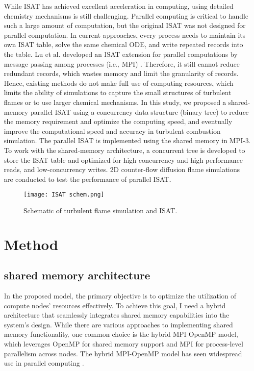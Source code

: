 While ISAT has achieved excellent acceleration in computing, using detailed chemistry mechanisms is still challenging. Parallel computing is critical to handle such a large amount of computation, but the original ISAT was not designed for parallel computation. In current approaches, every process needs to maintain its own ISAT table, solve the same chemical ODE, and write repeated records into the table. Lu et al. developed an ISAT extension for parallel computations by message passing among processes (i.e., MPI) \cite{lu2005investigation}. Therefore, it still cannot reduce redundant records, which wastes memory and limit the granularity of records.
Hence, existing methods do not make full use of computing resources, which limits the ability of simulations to capture the small structures of turbulent flames or to use larger chemical mechanisms. 
In this study, we proposed a shared-memory parallel ISAT using a concurrency data structure (binary tree) to reduce the memory requirement and optimize the computing speed, and eventually improve the computational speed and accuracy in turbulent combustion simulation. The parallel ISAT is implemented using the shared memory in MPI-3. To work with the shared-memory architecture, a concurrent tree is developed to store the ISAT table and optimized for high-concurrency and high-performance reads, and low-concurrency writes. 2D counter-flow diffusion flame simulations are conducted to test the performance of parallel ISAT.



\begin{figure}[htbp]
    \centering
\texttt{[image: ISAT schem.png]} 
\caption{Schematic of turbulent flame simulation and ISAT.}
\label{ISAT_Schematic} 
\end{figure}




\section{Method}
\subsection{shared memory architecture}
In the proposed model, the primary objective is to optimize the utilization of compute nodes' resources effectively. To achieve this goal, I need a hybrid architecture that seamlessly integrates shared memory capabilities into the system's design. While there are various approaches to implementing shared memory functionality, one common choice is the hybrid MPI-OpenMP model, which leverages OpenMP for shared memory support and MPI for process-level parallelism across nodes. The hybrid MPI-OpenMP model has seen widespread use in parallel computing \cite{ouro2019scalability,he2020structured,zhong2020efficien}.

